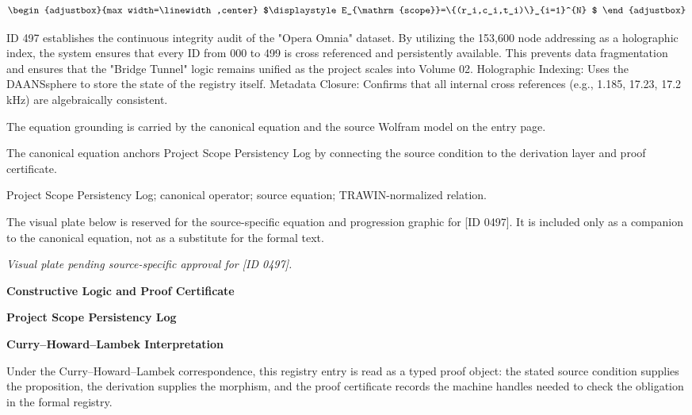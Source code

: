 \[
\begin{adjustbox}{max width=\linewidth,center}
$\displaystyle
E_{\mathrm{scope}}=\{(r_i,c_i,t_i)\}_{i=1}^{N}
$
\end{adjustbox}
\]

ID 497 establishes the continuous integrity audit of the "Opera Omnia" dataset. By utilizing the 153,600 node addressing as a holographic index, the system ensures that every ID from 000 to 499 is cross referenced and persistently available. This prevents data fragmentation and ensures that the "Bridge Tunnel" logic remains unified as the project scales into Volume 02. Holographic Indexing: Uses the DAANSsphere to store the state of the registry itself. Metadata Closure: Confirms that all internal cross references (e.g., 1.185, 17.23, 17.2 kHz) are algebraically consistent.

The equation grounding is carried by the canonical equation and the source Wolfram model on the entry page.

The canonical equation anchors Project Scope Persistency Log by connecting the source condition to the derivation layer and proof certificate.

Project Scope Persistency Log; canonical operator; source equation; TRAWIN-normalized relation.
\endgroup

\begingroup\footnotesize\sloppy
The visual plate below is reserved for the source-specific equation and progression graphic for [ID 0497]. It is included only as a companion to the canonical equation, not as a substitute for the formal text.
\par\endgroup
\begingroup\footnotesize\itshape
Visual plate pending source-specific approval for [ID 0497].
\par\endgroup

\clearpage
\begingroup\tzpsupportsetup
\noindent\textbf{\fontsize{10.8pt}{12.8pt}\selectfont [ID 0497] Constructive Logic and Proof Certificate}\par
\noindent\textbf{\fontsize{10pt}{12pt}\selectfont Project Scope Persistency Log}\par
\vspace{0.45em}
\begingroup
\footnotesize
\setlength{\parskip}{0.22em}
\setlength{\parindent}{0pt}
\noindent\textbf{Curry--Howard--Lambek Interpretation}\par
Under the Curry--Howard--Lambek correspondence, this registry entry is read as a typed proof
object: the stated source condition supplies the proposition, the derivation supplies the
morphism, and the proof certificate records the machine handles needed to check the obligation
in the formal registry.

